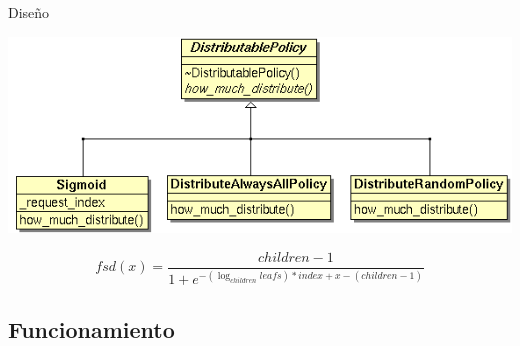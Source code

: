 \begin{subsection}{Diseño}
\begin{frame}
    \begin{center}
        \includegraphics[scale=.25]{images/distribution_policy.png}
    \end{center}
    \pause
    \begin{center}
        $$fsd(x) = \frac{children-1}{1 + e^{-(\log_{children}{leafs}) * index + x - (children-1)}} $$
    \end{center}
\end{frame}



\end{subsection}

\subsection{Funcionamiento}

